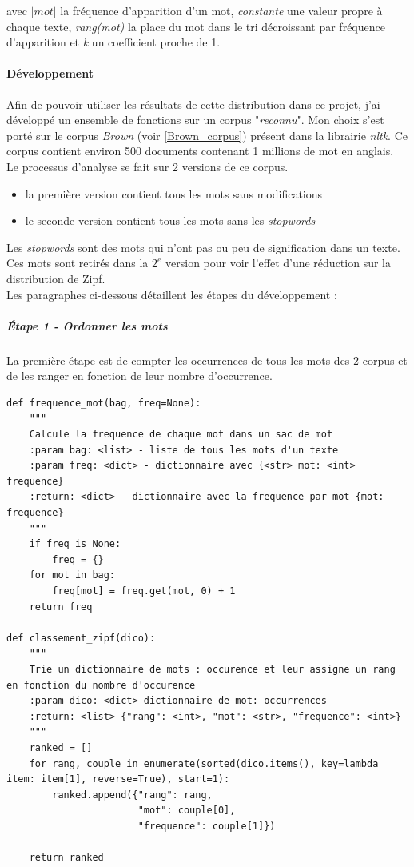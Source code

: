 \documentclass[a4paper,12pt]{article}
\begin{document}
		avec \emph{$|mot|$} la fréquence d'apparition d'un mot, \emph{constante} une valeur propre à chaque texte, \emph{rang(mot)} la place du mot dans le tri décroissant par fréquence d'apparition et \emph{k} un coefficient proche de 1. 
		
	\paragraph{Développement}
		Afin de pouvoir utiliser les résultats de cette distribution dans ce projet, j'ai développé un ensemble de fonctions sur un corpus "\emph{reconnu}". Mon choix s'est porté sur le corpus \emph{Brown} (voir \ref{Brown_corpus}) présent dans la librairie \emph{nltk}. Ce corpus contient environ 500 documents contenant 1 millions de mot en anglais.\\
		
		Le processus d'analyse se fait sur 2 versions de ce corpus.
		\begin{itemize}
			\item la première version contient tous les mots sans modifications
			\item le seconde version contient tous les mots sans les \emph{stopwords}
		\end{itemize}
		Les \emph{stopwords} sont des mots qui n'ont pas ou peu de signification dans un texte. Ces mots sont retirés dans la $2^e$ version pour voir l'effet d'une réduction sur la distribution de Zipf. \\
		
		Les paragraphes ci-dessous détaillent les étapes du développement :
		
		\subparagraph{Étape 1 - Ordonner les mots}
			La première étape est de compter les occurrences de tous les mots des 2 corpus et de les ranger en fonction de leur nombre d’occurrence. 
			\begin{lstlisting}[title=Triage des mots]
def frequence_mot(bag, freq=None):
    """
    Calcule la frequence de chaque mot dans un sac de mot
    :param bag: <list> - liste de tous les mots d'un texte
    :param freq: <dict> - dictionnaire avec {<str> mot: <int> frequence}
    :return: <dict> - dictionnaire avec la frequence par mot {mot: frequence}
    """
    if freq is None:
        freq = {}
    for mot in bag:
        freq[mot] = freq.get(mot, 0) + 1
    return freq
		
def classement_zipf(dico):
    """
    Trie un dictionnaire de mots : occurence et leur assigne un rang en fonction du nombre d'occurence
    :param dico: <dict> dictionnaire de mot: occurrences
    :return: <list> {"rang": <int>, "mot": <str>, "frequence": <int>}
    """
    ranked = []
    for rang, couple in enumerate(sorted(dico.items(), key=lambda item: item[1], reverse=True), start=1):
        ranked.append({"rang": rang,
                       "mot": couple[0],
                       "frequence": couple[1]})

    return ranked \end{lstlisting}
    
\end{document}
